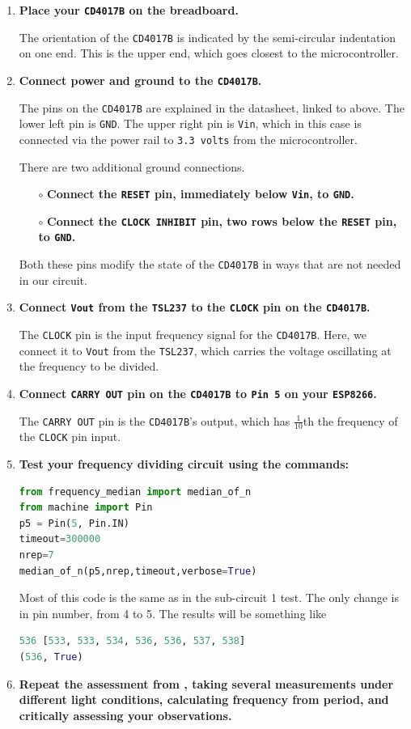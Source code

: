 \begin{enumerate}
	\item \textbf{Place your \texttt{CD4017B} on the breadboard.}
	
	The orientation of the \texttt{CD4017B} is indicated by the semi-circular indentation on one end.
	This is the upper end, which goes closest to the microcontroller.
	
	\item \textbf{Connect power and ground to the \texttt{CD4017B}.}
	
	The pins on the \texttt{CD4017B} are explained in the datasheet, linked to above.
	The lower left pin is \texttt{GND}.
	The upper right pin is \texttt{Vin}, which in this case is connected via the power rail to \texttt{3.3 volts} from the microcontroller.
	
	\smallskip
	There are two additional ground connections. 
	\begin{itemize}
		\item[$\circ$] \textbf{Connect the \texttt{RESET} pin, immediately below \texttt{Vin}, to \texttt{GND}.} 
		\item[$\circ$] \textbf{Connect the \texttt{CLOCK INHIBIT} pin, two rows below the \texttt{RESET} pin, to \texttt{GND}.}	
	\end{itemize} 
	Both these pins modify the state of the \texttt{CD4017B} in ways that are not needed in our circuit.

	\item \textbf{Connect \texttt{Vout} from the \texttt{TSL237} to the \texttt{CLOCK} pin on the \texttt{CD4017B}.}

	The \texttt{CLOCK} pin is the input frequency signal for the \texttt{CD4017B}.
	Here, we connect it to \texttt{Vout} from the \texttt{TSL237}, which carries the voltage oscillating at the frequency to be divided. 
	
	\item \textbf{Connect \texttt{CARRY OUT} pin on the \texttt{CD4017B} to \texttt{Pin 5} on your \texttt{ESP8266}.}
	
	The \texttt{CARRY OUT} pin is the \texttt{CD4017B}'s output, which has $\frac{1}{10}$th the frequency of the \texttt{CLOCK} pin input. 

	\item \textbf{Test your frequency dividing circuit using the commands:}
\begin{lstlisting}[language=Python]
from frequency_median import median_of_n
from machine import Pin
p5 = Pin(5, Pin.IN)
timeout=300000
nrep=7
median_of_n(p5,nrep,timeout,verbose=True)
\end{lstlisting}	
	Most of this code is the same as in the sub-circuit 1 test.
	The only change is in pin number, from 4 to 5.
	The results will be something like
\begin{lstlisting}[language=Python]
536 [533, 533, 534, 536, 536, 537, 538]
(536, True)
\end{lstlisting}		
	\item \textbf{Repeat the assessment from , taking several measurements under different light conditions, calculating frequency from period, and critically assessing your observations.}


\end{enumerate}
